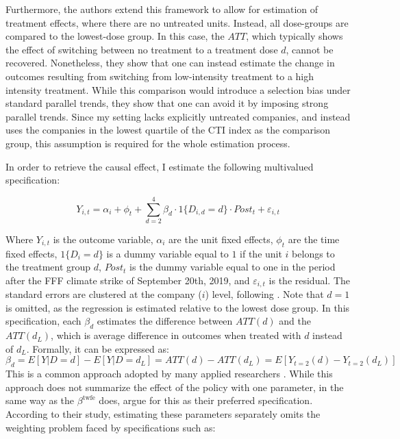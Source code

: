 \documentclass[12pt]{article}
\begin{document}
Furthermore, the authors extend this framework to allow for estimation of treatment effects, where there are no untreated units. Instead, all dose-groups are compared to the lowest-dose group. In this case, the $ATT$, which typically shows the effect of switching between no treatment to a treatment dose $d$, cannot be recovered. Nonetheless, they show that one can instead estimate the change in outcomes resulting from switching from low-intensity treatment to a high intensity treatment. While this comparison would introduce a selection bias under standard parallel trends, they show that one can avoid it by imposing strong parallel trends. Since my setting lacks explicitly untreated companies, and instead uses the companies in the lowest quartile of the CTI index as the comparison group, this assumption is required for the whole estimation process.


In order to retrieve the causal effect, I estimate the following multivalued specification:

\begin{equation}
    Y_{i,t} = \alpha_i + \phi_t + \sum_{d=2}^{4} \beta_d \cdot 1\{D_{i,d}=d\}\cdot Post_t + \varepsilon_{i,t}
\end{equation}

Where $Y_{i,t}$ is the outcome variable, $\alpha_i$ are the unit fixed effects, $\phi_t$ are the time fixed effects, $1\{D_{i}=d\}$ is a dummy variable equal to $1$ if the unit $i$ belongs to the treatment group $d$, $Post_t$ is the dummy variable equal to one in the period after the FFF climate strike of September 20th, 2019, and $\varepsilon_{i,t}$ is the residual. The standard errors are clustered at the company ($i$) level, following \textcite{abadieWhenShouldYou2022}. Note that $d=1$ is omitted, as the regression is estimated relative to the lowest dose group. In this specification, each $\beta_d$ estimates the difference between $ATT(d)$ and the $ATT(d_L)$, which is average difference in outcomes when treated with $d$ instead of $d_L$. Formally, it can be expressed as: 
\begin{equation}
    \beta_d = E[Y|D = d] - E[Y |D = d_L] = ATT(d) - ATT(d_L) = E[Y_{t=2}(d) - Y_{t=2}(d_L)]
\end{equation}
This is a common approach adopted by many applied researchers \parencite{acemoglu_finkelstein_medicare,deschenes_greenstone_clim_change}. While this approach does not summarize the effect of the policy with one parameter, in the same way as the $\beta^{\text{twfe}}$ does, \citeauthor{callawayDifferenceinDifferencesContinuousTreatment2025} argue for this as their preferred specification. According to their study, estimating these parameters separately omits the weighting problem faced by specifications such as:
\end{document}
